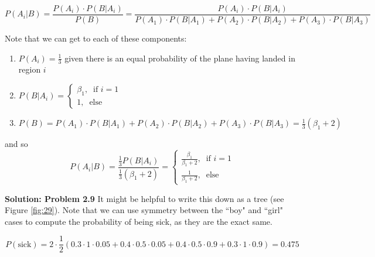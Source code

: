 \documentclass[12pt,twoside]{article}
\numberwithin{equation}{section}
\begin{document}
$$P(A_{i}|B) = \frac{P(A_{i})\cdot P(B|A_{i})}{P(B)} = \frac{P(A_{i})\cdot P(B|A_{i})}{P(A_{1})\cdot P(B|A_{1}) + P(A_{2})\cdot P(B|A_{2}) + P(A_{3})\cdot P(B|A_{3})}$$

Note that we can get to each of these components:
\begin{enumerate}
	\item $P(A_{i}) = \frac{1}{3}$ given there is an equal probability of the plane having landed in region $i$
	\item $P(B|A_{i}) = \begin{cases} \beta_{1}, \;\;\text{if }i=1\\
	1, \;\;\text{else}
	\end{cases}$
	\item $P(B) = P(A_{1})\cdot P(B|A_{1}) + P(A_{2})\cdot P(B|A_{2}) + P(A_{3})\cdot P(B|A_{3}) = \frac{1}{3}\left(\beta_{1}+2\right)$
\end{enumerate}
and so $$P(A_{i}|B) = \frac{\frac{1}{3}P(B|A_{i})}{\frac{1}{3}\left(\beta_{1}+2\right)} =\begin{cases}
\frac{\beta_{1}}{\beta_{1}+2},\;\;\text{if }i=1\\
\frac{1}{\beta_{1}+2},\;\;\text{else}
\end{cases}$$


\noindent \textbf{Solution: Problem 2.9}
It might be helpful to write this down as a tree (see Figure \ref{fig:29}). Note that we can use symmetry between the ``boy" and ``girl" cases to compute the probability of being sick, as they are the exact same.

$$P(\text{sick}) = 2\cdot \frac{1}{2} \left(0.3\cdot 1 \cdot 0.05 + 0.4\cdot 0.5 \cdot 0.05 + 0.4\cdot 0.5 \cdot 0.9 + 0.3\cdot 1 \cdot 0.9\right) = 0.475$$
\end{document}
